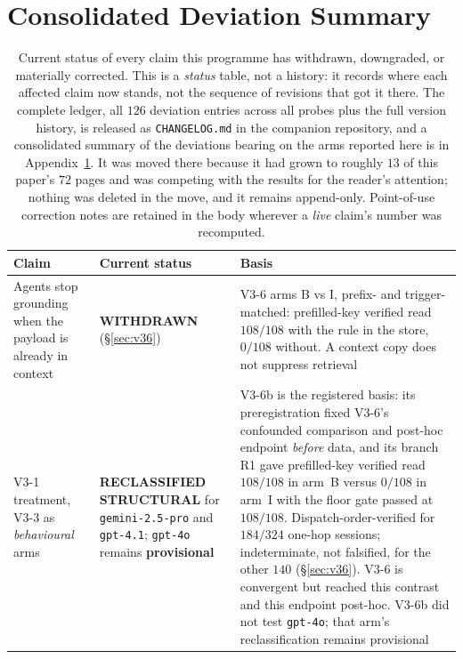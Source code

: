 \documentclass{article}
\begin{document}

\section{Consolidated Deviation Summary}
\label{app:deviations}

\begingroup
\footnotesize
\setlength{\LTcapwidth}{\textwidth}
\begin{table}[t]
\caption{Current status of every claim this programme has withdrawn, downgraded, or
materially corrected. This is a \emph{status} table, not a history: it records where each
affected claim now stands, not the sequence of revisions that got it there. The complete
ledger, all $126$ deviation entries across all probes plus the full version history, is
released as \texttt{CHANGELOG.md} in the companion repository, and a consolidated summary of
the deviations bearing on the arms reported here is in Appendix~\ref{app:deviations}. It was moved there because it
had grown to roughly $13$ of this paper's $72$ pages and was competing with the results for
the reader's attention; nothing was deleted in the move, and it remains append-only.
Point-of-use correction notes are retained in the body wherever a \emph{live} claim's number
was recomputed.}
\label{tab:withdrawn}
\centering
\small
\begin{tabular}{@{}p{}p{}p{}@{}}
\toprule
\textbf{Claim} & \textbf{Current status} & \textbf{Basis} \\
\midrule
Agents stop grounding when the payload is already in context
 & \textbf{WITHDRAWN} (\S\ref{sec:v36})
 & V3-6 arms B vs I, prefix- and trigger-matched: prefilled-key verified read $108/108$ with the rule in the store, $0/108$ without. A context copy does not suppress retrieval \\
V3-1 treatment, V3-3 as \emph{behavioural} arms
 & \textbf{RECLASSIFIED STRUCTURAL} for \texttt{gemini-2.5-pro} and \texttt{gpt-4.1}; \texttt{gpt-4o} remains \textbf{provisional}
 & V3-6b is the registered basis: its preregistration fixed V3-6's confounded comparison and post-hoc endpoint \emph{before} data, and its branch R1 gave prefilled-key verified read $108/108$ in arm~B versus $0/108$ in arm~I with the floor gate passed at $108/108$. Dispatch-order-verified for $184/324$ one-hop sessions; indeterminate, not falsified, for the other $140$ (\S\ref{sec:v36}). V3-6 is convergent but reached this contrast and this endpoint post-hoc. V3-6b did not test \texttt{gpt-4o}; that arm's reclassification remains provisional \\

\end{tabular}
\end{table}
\end{document}
